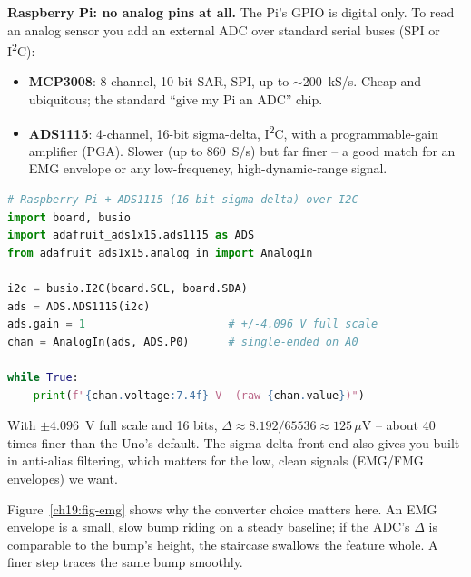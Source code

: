 \begin{buildbox}
\textbf{Raspberry Pi: no analog pins at all.} The Pi's GPIO is digital only. To read an analog
sensor you add an external ADC over standard serial buses (SPI or I\textsuperscript{2}C):
\begin{itemize}
  \item \textbf{MCP3008}: 8-channel, 10-bit SAR, SPI, up to $\sim$200~kS/s. Cheap and ubiquitous;
        the standard ``give my Pi an ADC'' chip.
  \item \textbf{ADS1115}: 4-channel, 16-bit sigma-delta, I\textsuperscript{2}C, with a
        programmable-gain amplifier (PGA). Slower (up to 860~S/s) but far finer -- a good match for an
        EMG envelope or any low-frequency, high-dynamic-range signal.
\end{itemize}
\begin{lstlisting}[language=Python]
# Raspberry Pi + ADS1115 (16-bit sigma-delta) over I2C
import board, busio
import adafruit_ads1x15.ads1115 as ADS
from adafruit_ads1x15.analog_in import AnalogIn

i2c = busio.I2C(board.SCL, board.SDA)
ads = ADS.ADS1115(i2c)
ads.gain = 1                      # +/-4.096 V full scale
chan = AnalogIn(ads, ADS.P0)      # single-ended on A0

while True:
    print(f"{chan.voltage:7.4f} V  (raw {chan.value})")
\end{lstlisting}
With $\pm4.096$~V full scale and 16 bits, $\Delta \approx 8.192/65536 \approx 125\,\mu$V -- about
40 times finer than the Uno's default. The sigma-delta front-end also gives you built-in
anti-alias filtering, which matters for the low, clean signals (EMG/FMG envelopes) we want.
\end{buildbox}

Figure~\ref{ch19:fig-emg} shows why the converter choice matters here. An EMG envelope is a
small, slow bump riding on a steady baseline; if the ADC's $\Delta$ is comparable to the bump's
height, the staircase swallows the feature whole. A finer step traces the same bump smoothly.

